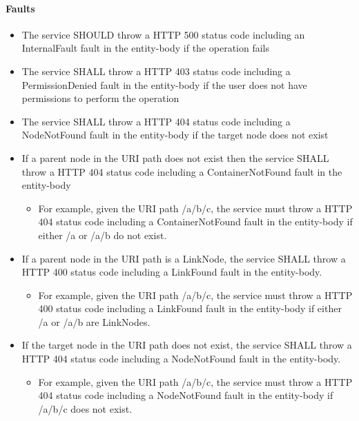 \documentclass[11pt,a4paper]{ivoa}
\begin{document}
\paragraph{Faults}
\begin{itemize}
    \item The service SHOULD throw a HTTP 500 status code including an InternalFault fault in the entity-body if the operation fails
    \item The service SHALL throw a HTTP 403 status code including a PermissionDenied fault in the entity-body if the user does not have permissions to perform the operation
    \item The service SHALL throw a HTTP 404 status code including a NodeNotFound fault in the entity-body if the target node does not exist
    \item If a parent node in the URI path does not exist then the service SHALL throw a HTTP 404 status code including a ContainerNotFound fault in the entity-body
    \begin{itemize}
        \item For example, given the URI path /a/b/c, the service must throw a HTTP 404 status code including a ContainerNotFound fault in the entity-body if either /a or /a/b do not exist.
    \end{itemize}
    \item If a parent node in the URI path is a LinkNode, the service SHALL throw a HTTP 400 status code including a LinkFound fault in the entity-body.
    \begin{itemize}
        \item For example, given the URI path /a/b/c, the service must throw a HTTP 400 status code including a LinkFound fault in the entity-body if either /a or /a/b are LinkNodes.
    \end{itemize}
    \item If the target node in the URI path does not exist, the service SHALL throw a HTTP 404 status code including a NodeNotFound fault in the entity-body.
    \begin{itemize}
        \item For example, given the URI path /a/b/c, the service must throw a HTTP 404 status code including a NodeNotFound fault in the entity-body if /a/b/c does not exist.
    \end{itemize}
\end{itemize}
\end{document}
